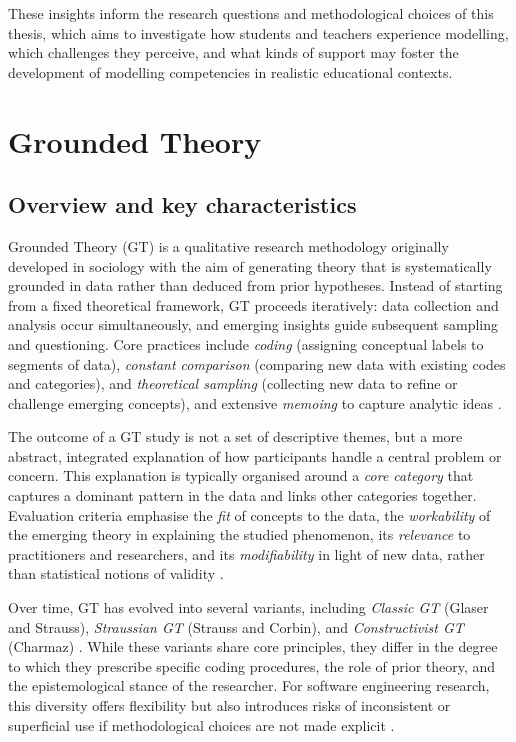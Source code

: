 These insights inform the research questions and methodological choices of this thesis, which aims to investigate how students and teachers experience modelling, which challenges they perceive, and what kinds of support may foster the development of modelling competencies in realistic educational contexts.


\section{Grounded Theory}
\label{sec:grounded_theory}

\subsection{Overview and key characteristics}
\label{subsec:gt_overview}

Grounded Theory (GT) is a qualitative research methodology originally developed in sociology with the aim of generating theory that is systematically grounded in data rather than deduced from prior hypotheses. Instead of starting from a fixed theoretical framework, GT proceeds iteratively: data collection and analysis occur simultaneously, and emerging insights guide subsequent sampling and questioning. Core practices include \emph{coding} (assigning conceptual labels to segments of data), \emph{constant comparison} (comparing new data with existing codes and categories), and \emph{theoretical sampling} (collecting new data to refine or challenge emerging concepts), and extensive \emph{memoing} to capture analytic ideas \cite{adolph2011using,stol2016grounded}. 

The outcome of a GT study is not a set of descriptive themes, but a more abstract, integrated explanation of how participants handle a central problem or concern. This explanation is typically organised around a \emph{core category} that captures a dominant pattern in the data and links other categories together. Evaluation criteria emphasise the \emph{fit} of concepts to the data, the \emph{workability} of the emerging theory in explaining the studied phenomenon, its \emph{relevance} to practitioners and researchers, and its \emph{modifiability} in light of new data, rather than statistical notions of validity \cite{adolph2011using}.

Over time, GT has evolved into several variants, including \emph{Classic GT} (Glaser and Strauss), \emph{Straussian GT} (Strauss and Corbin), and \emph{Constructivist GT} (Charmaz) \cite{charmaz2006constructing,glaser1967discovery,strauss1998basics}. While these variants share core principles, they differ in the degree to which they prescribe specific coding procedures, the role of prior theory, and the epistemological stance of the researcher. For software engineering research, this diversity offers flexibility but also introduces risks of inconsistent or superficial use if methodological choices are not made explicit \cite{stol2016grounded}.

